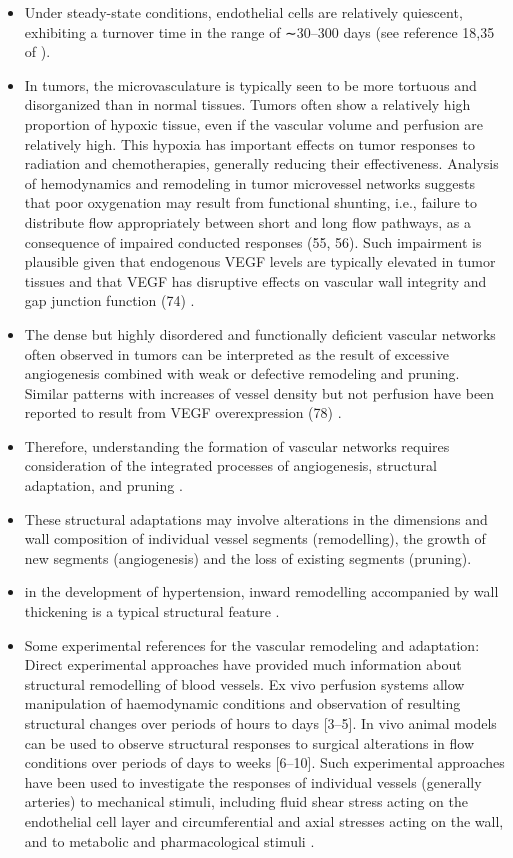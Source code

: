 \begin{itemize}
	\item Under steady-state conditions, endothelial cells are relatively quiescent, exhibiting a turnover time in the range of ∼30–300 days (see reference 18,35 of \cite{Pries2014}).
	\item In tumors, the microvasculature is typically seen to be more tortuous and disorganized than in normal tissues. Tumors often show a relatively high proportion of hypoxic tissue, even if the vascular volume and perfusion are relatively high. This hypoxia has important effects on tumor responses to radiation and chemotherapies, generally reducing their effectiveness. Analysis of hemodynamics and remodeling in tumor microvessel networks suggests that poor oxygenation may result from functional shunting, i.e., failure to distribute flow appropriately between short and long flow pathways, as a consequence of impaired conducted responses (55, 56). Such impairment is plausible given that endogenous VEGF levels are typically elevated in tumor tissues and that VEGF has disruptive effects on vascular wall integrity and gap junction function (74) \cite{Pries2014}.
	\item The dense but highly disordered and functionally deficient vascular networks often observed in tumors can be interpreted as the result of excessive angiogenesis combined with weak or defective remodeling and pruning. Similar patterns with increases of vessel density but not perfusion have been reported to result from VEGF overexpression (78) \cite{Pries2014}.
	\item Therefore, understanding the formation of
	vascular networks requires consideration of the integrated processes of angiogenesis, structural adaptation, and pruning \cite{Pries2014}.
	\item These structural adaptations may involve alterations in the dimensions and wall composition of individual vessel segments (remodelling), the growth of new segments (angiogenesis) and the loss of existing segments (pruning)\cite{Secomb2012}.
	\item  in the development of hypertension, inward remodelling accompanied by wall thickening is a typical structural feature \cite{Secomb2012}.
	\item Some experimental references for the vascular remodeling and adaptation: Direct experimental approaches have provided much information about structural remodelling of blood vessels. Ex vivo perfusion systems allow manipulation of haemodynamic conditions and observation of resulting structural changes over periods of hours to days [3–5]. In vivo animal models can be used to observe structural responses to surgical alterations in flow conditions over periods of days to weeks [6–10]. Such experimental approaches have been used to investigate the responses of individual vessels (generally arteries) to mechanical stimuli, including fluid shear stress acting on the endothelial cell layer and circumferential and axial stresses acting on the wall, and to metabolic and pharmacological stimuli \cite{Secomb2012}.

\end{itemize}
